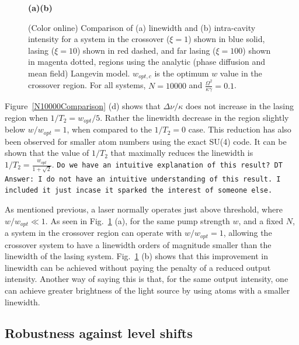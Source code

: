 \documentclass[aps,
twocolumn,
showpacs,
superscriptaddress,groupedaddress]{revtex4}
\newcommand{\dmcomment}[1]{{\tt #1}}
\begin{document}
\begin{figure}
\begin{center}
	\hspace{6mm}\textbf{(a)}\hspace{37mm}\textbf{(b)} \hspace{35mm}
\end{center}
		\vspace{-5mm}
\caption{(Color online) Comparison of (a) linewidth and (b) intra-cavity
intensity for a system in the crossover ($\xi=1$) shown in blue solid,
lasing ($\xi=10$) shown in red dashed, and far lasing ($\xi=100$) shown
in magenta dotted, regions using the analytic (phase diffusion and mean
field) Langevin model. $w_{opt,c}$ is the optimum $w$ value in the
crossover region. For all systems, $N=10000$ and $\frac{\Omega^2}{\kappa
\gamma}=0.1$.}
\label{LWadaComparison}
\end{figure}

Figure~\ref{N10000Comparison} (d) shows that $\Delta \nu/\kappa$ does
not increase in the lasing region when $1/T_2=w_{opt}/5$.  Rather the
linewidth decrease in the region slightly below $w/w_{opt}=1$, when
compared to the $1/T_2=0$ case. This reduction has also been observed
for smaller atom numbers using the exact SU(4) code. It can be shown
that the value of $1/T_2$ that maximally reduces the linewidth is
$1/T_2=\frac{w_{opt}}{1+\sqrt{2}}$.
\dmcomment{Do we have an intuitive explanation of this result? DT Answer: I do not have an intuitive understanding of this result. I included it just incase it sparked the interest of someone else.}

As mentioned previous, a laser normally operates just above threshold,
where $w/w_{opt} \ll 1$. As seen in Fig.~\ref{LWadaComparison} (a), for
the same pump strength $w$, and a fixed $N$, a system in the crossover
region can operate with $w/w_{opt} = 1$, allowing the crossover system
to have a linewidth orders of magnitude smaller than the linewidth of
the lasing system.  Fig.~\ref{LWadaComparison} (b) shows that this
improvement in linewidth can be achieved without paying the penalty of a
reduced output intensity.  Another way of saying this is that, for the
same output intensity, one can achieve greater brightness of the light
source by using atoms with a smaller linewidth.


\subsection{Robustness against level shifts}
\end{document}
